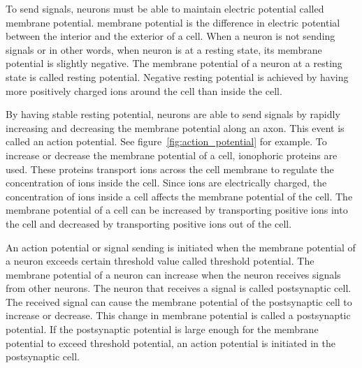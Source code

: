 To send signals, \glspl{neuron} must be able to maintain electric potential called \gls{membrane potential}. \Gls{membrane potential} is the difference in electric potential between the interior and the exterior of a cell. When a \gls{neuron} is not sending signals or in other words, when neuron is at a \gls{resting state}, its \gls{membrane potential} is slightly negative. The \gls{membrane potential} of a \gls{neuron} at a \gls{resting state} is called \gls{resting potential}. Negative \gls{resting potential} is achieved by having more positively charged ions around the cell than inside the cell.

By having stable \gls{resting potential}, \glspl{neuron} are able to send signals by rapidly increasing and decreasing the \gls{membrane potential} along an \gls{axon}. This event is called an \gls{action potential}. See figure~\ref{fig:action_potential} for example. To increase or decrease the \gls{membrane potential} of a cell, \glspl{ionophoric protein} are used. These proteins transport ions across the cell membrane to regulate the concentration of ions inside the cell. Since ions are electrically charged, the concentration of ions inside a cell affects the \gls{membrane potential} of the cell. The \gls{membrane potential} of a cell can be increased by transporting positive ions into the cell and decreased by transporting positive ions out of the cell. 

An \gls{action potential} or signal sending is initiated when the \gls{membrane potential} of a \gls{neuron} exceeds certain threshold value called \gls{threshold potential}. The \gls{membrane potential} of a \gls{neuron} can increase when the \gls{neuron} receives signals from other \glspl{neuron}. The \gls{neuron} that receives a signal is called \gls{postsynaptic cell}. The received signal can cause the \gls{membrane potential} of the \gls{postsynaptic cell} to increase or decrease. This change in \gls{membrane potential} is called a \gls{postsynaptic potential}. If the \gls{postsynaptic potential} is large enough for the \gls{membrane potential} to exceed \gls{threshold potential}, an \gls{action potential} is initiated in the \gls{postsynaptic cell}.

